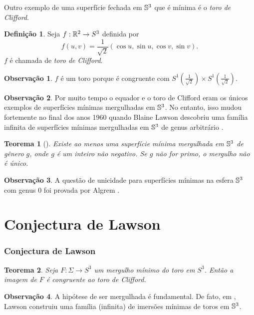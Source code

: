 \documentclass[12pt,a4paper]{beamer}
\newtheorem{teorema}{Teorema}
\theoremstyle{definition}
\newtheorem{definicao}{Definição}
\newtheorem{observacao}{Observação}
\begin{document}
\begin{frame}
	
	Outro exemplo de uma superfície fechada em $\mathbb{S}^3$ que é mínima é o \emph{toro de Clifford}.
	
	\begin{definicao}
		Seja $f: \mathbb R^2 \rightarrow S^3$ definida por
		\begin{equation*}
			f(u,v) = \frac{1}{\sqrt{2}} \left(\cos u, \sin u, \cos v, \sin v\right).
		\end{equation*}
		$f$ é chamada de \emph{toro de Clifford}.
	\end{definicao}

	\begin{observacao}
		$f$ é um toro porque é congruente com $S^1 \left(\frac{1}{\sqrt{2}}\right) \times S^1 \left(\frac{1}{\sqrt{2}}\right)$.
	\end{observacao}
\end{frame}

\begin{frame}
	\begin{observacao}
		Por muito tempo o equador e o toro de Clifford eram os únicos exemplos de superfícies mínimas mergulhadas em $\mathbb{S}^3$. No entanto, isso mudou fortemente no final dos
		anos 1960 quando Blaine Lawson descobriu uma família infinita de superfícies mínimas
		mergulhadas em $\mathbb{S}^3$ de genus arbitrário \cite{Lawson1970}.
	\end{observacao}
\end{frame}


\begin{frame}
	\begin{teorema}[\cite{Lawson1970}]
		Existe ao menos uma superfície mínima mergulhada em $\mathbb{S}^3$	de gênero $g$, onde $g$ é um inteiro não negativo. Se $g$ não for primo, o mergulho não é único.
	\end{teorema}
	
	\begin{observacao}
		A questão de unicidade para superfícies mínimas na esfera $\mathbb{S}^3$ com genus $0$ foi provada por Algrem \cite{Almgren1966}.
	\end{observacao}
\end{frame}

\section{Conjectura de Lawson}

\begin{frame}
	\frametitle{Conjectura de Lawson}
	\begin{teorema}
		Seja $F: \Sigma \rightarrow S^3$ um mergulho mínimo do toro em $S^3$. Então a imagem de $F$ é congruente ao toro de Clifford.
	\end{teorema}

	\begin{observacao}
		A hipótese de ser mergulhada é fundamental. De fato, em \cite{Lawson1969}, Lawson construiu uma família (infinita) de imersões mínimas de toros em $\mathbb{S}^3$. 
	\end{observacao}
\end{frame}
\end{document}
